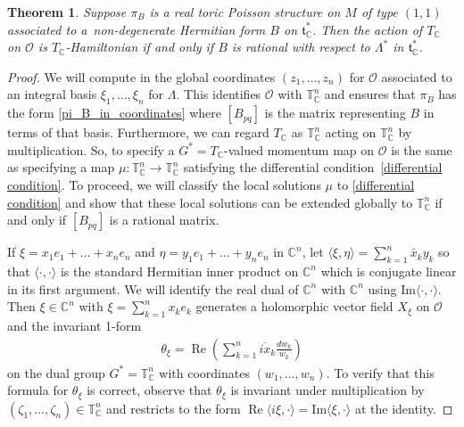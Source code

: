 \documentclass[10pt,a4paper]{amsart}
\numberwithin{equation}{section}
\newtheorem{Theorem}{Theorem}[section]
\begin{document}
\begin{Theorem}
Suppose $\pi_B$ is a real toric Poisson structure on $M$ of type $(1,1)$ associated to a~non-degenerate Hermitian form $B$ on ${\mathfrak t}_{\mathbb C}^*$. Then the action of $T_{\mathbb C}$ on $\mathcal O$ is $T_{\mathbb C}$-Hamiltonian if and only if $B$ is rational with respect to $\Lambda^*$ in ${\mathfrak t}_{\mathbb C}^*$.
\end{Theorem}
\begin{proof}
We will compute in the global coordinates $(z_1,\dots,z_n)$ for $\mathcal O$ associated to an integral basis $\xi_1,\dots,\xi_n$ for $\Lambda$. This identif\/ies $\mathcal O$ with ${\mathbb T}_{\mathbb C}^n$ and ensures that $\pi_B$ has the form \eqref{pi_B_in_coordinates} where $[B_{pq}]$ is the matrix representing $B$ in terms of that basis. Furthermore, we can regard $T_{\mathbb C}$ as ${\mathbb T}_{\mathbb C}^n$ acting on ${\mathbb T}_{\mathbb C}^n$ by multiplication. So, to specify a $G^*=T_{\mathbb C}$-valued momentum map on $\mathcal O$ is the same as specifying a map $\mu\colon {\mathbb T}_{\mathbb C}^n\to{\mathbb T}_{\mathbb C}^n$ satisfying the dif\/ferential condition~\eqref{differential condition}. To proceed, we will classify the local solutions $\mu$ to \eqref{differential condition} and show that these local solutions can be extended globally to ${\mathbb T}_{\mathbb C}^n$ if and only if $[B_{pq}]$ is a rational matrix.

If $\xi=x_1e_1+\dots+x_ne_n$ and $\eta=y_1e_1+\dots+y_ne_n$ in ${\mathbb C}^n$, let $\langle \xi,\eta\rangle = \sum\limits_{k=1}^n \bar{x}_ky_k$ so that $\langle\cdot,\cdot\rangle$ is the standard Hermitian inner product on ${\mathbb C}^n$ which is conjugate linear in its f\/irst argument. We will identify the real dual of ${\mathbb C}^n$ with ${\mathbb C}^n$ using $\mathrm{Im}\langle\cdot,\cdot\rangle$. Then $\xi\in{\mathbb C}^n$ with $\xi=\sum\limits_{k=1}^n x_ke_k$ generates a holomorphic vector f\/ield $X_\xi$ on $\mathcal O$ and the invariant 1-form
\begin{gather*}
\theta_\xi = \operatorname{Re}\left(\sum_{k=1}^n \overline{ix}_k\frac{dw_k}{w_k}\right)
\end{gather*}
on the dual group $G^*={\mathbb T}_{\mathbb C}^n$ with coordinates $(w_1,\dots,w_n)$. To verify that this formula for $\theta_\xi$ is correct, observe that $\theta_\xi$ is invariant under multiplication by $(\zeta_1,\dots,\zeta_n)\in {\mathbb T}_{\mathbb C}^n$ and restricts to the form $\operatorname{Re}\langle i\xi,\cdot\rangle=\mathrm{Im}\langle \xi,\cdot\rangle$ at the identity.


\end{proof}
\end{document}
